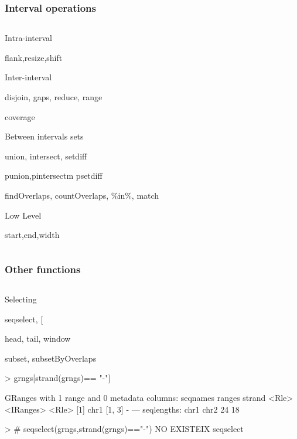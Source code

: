 \documentclass{beamer}
\begin{document}
\begin{frame}
\frametitle{Interval operations}
\begin{column}{1\textwidth}
  \bit
      \item Intra-interval
        \bit
            \item flank,resize,shift
        \eit
      \item Inter-interval
        \bit
            \item disjoin, gaps, reduce, range
            \item coverage
        \eit
      \item Between intervals sets
        \bit
            \item union, intersect, setdiff
            \item punion,pintersectm psetdiff
            \item findOverlaps, countOverlaps, \%in\%, match
        \eit
      \item Low Level
        \bit
            \item start,end,width
        \eit
  \eit
  \end{column}
\end{frame}


\begin{frame}[fragile]
\frametitle{Other functions}
\begin{column}{1\textwidth}
  \bit
      \item Selecting
        \bit
            \item seqselect, [
            \item head, tail, window
            \item subset, subsetByOverlaps
                     \begin{uncoverenv}
\begin{Schunk}
\begin{Sinput}
> grngs[strand(grngs)== "-"]
\end{Sinput}
\begin{Soutput}
GRanges with 1 range and 0 metadata columns:
      seqnames    ranges strand
         <Rle> <IRanges>  <Rle>
  [1]     chr1    [1, 3]      -
  ---
  seqlengths:
   chr1 chr2
     24   18
\end{Soutput}
\begin{Sinput}
> # seqselect(grngs,strand(grngs)=="-") NO EXISTEIX seqselect
\end{Sinput}
\end{Schunk}
        \end{uncoverenv}  
        \eit
  \eit
  \end{column}
\end{frame}
\end{document}

